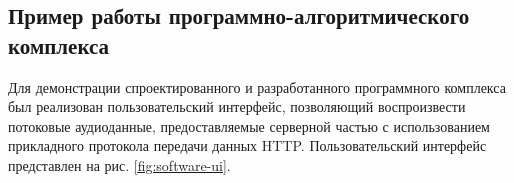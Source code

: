        
    \subsection{Пример работы программно-алгоритмического комплекса}
        \par Для демонстрации спроектированного и разработанного программного комплекса был реализован пользовательский интерфейс,
        позволяющий воспроизвести потоковые аудиоданные, 
        предоставляемые серверной частью с использованием прикладного протокола передачи данных HTTP.
        Пользовательский интерфейс представлен на рис. \ref{fig:software-ui}.
        \begin{figure}[!h]

\end{figure}
